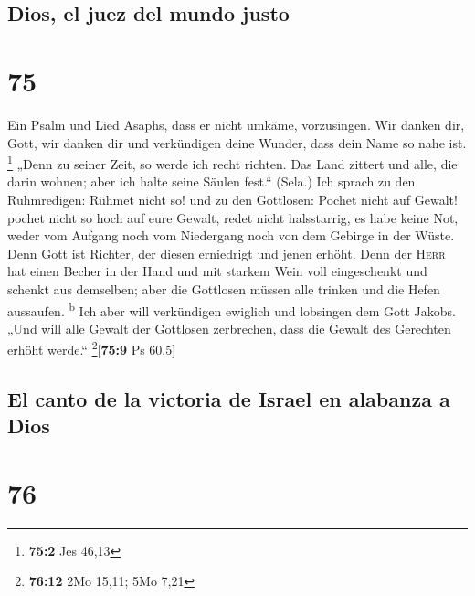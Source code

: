 \hypertarget{dios-el-juez-del-mundo-justo}{%
\subsection{Dios, el juez del mundo
justo}\label{dios-el-juez-del-mundo-justo}}

\hypertarget{section-74}{%
\section{75}\label{section-74}}

 Ein Psalm und Lied Asaphs, dass er nicht umkäme,
vorzusingen.  Wir danken dir, Gott, wir danken dir und
verkündigen deine Wunder, dass dein Name so nahe ist. \footnote{\textbf{75:2}
  Jes 46,13}  „Denn zu seiner Zeit, so werde ich recht
richten.  Das Land zittert und alle, die darin wohnen;
aber ich halte seine Säulen fest.`` (Sela.)  Ich sprach zu
den Ruhmredigen: Rühmet nicht so! und zu den Gottlosen: Pochet nicht auf
Gewalt!  pochet nicht so hoch auf eure Gewalt, redet nicht
halsstarrig,  es habe keine Not, weder vom Aufgang noch
vom Niedergang noch von dem Gebirge in der Wüste.  Denn
Gott ist Richter, der diesen erniedrigt und jenen erhöht. 
Denn der \textsc{Herr} hat einen Becher in der Hand und mit starkem Wein
voll eingeschenkt und schenkt aus demselben; aber die Gottlosen müssen
alle trinken und die Hefen aussaufen. \textsuperscript{b}
 Ich aber will verkündigen ewiglich und lobsingen dem
Gott Jakobs.  „Und will alle Gewalt der Gottlosen
zerbrechen, dass die Gewalt des Gerechten erhöht werde.``
\footnote{\textbf{76:12} 2Mo 15,11; 5Mo 7,21}{[}\textbf{75:9} Ps 60,5{]}

\hypertarget{el-canto-de-la-victoria-de-israel-en-alabanza-a-dios}{%
\subsection{El canto de la victoria de Israel en alabanza a
Dios}\label{el-canto-de-la-victoria-de-israel-en-alabanza-a-dios}}

\hypertarget{section-75}{%
\section{76}\label{section-75}}

